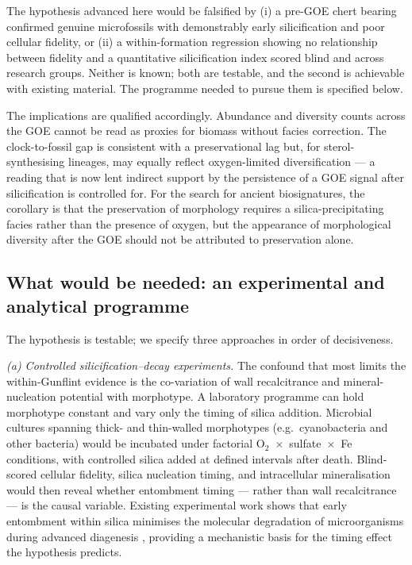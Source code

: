 \documentclass[11pt]{article}
\begin{document}
The hypothesis advanced here would be falsified by (i) a pre-GOE chert bearing confirmed genuine
microfossils with demonstrably early silicification and poor cellular fidelity, or (ii) a
within-formation regression showing no relationship between fidelity and a quantitative
silicification index scored blind and across research groups. Neither is known; both are testable,
and the second is achievable with existing material. The programme needed to pursue them is
specified below.

The implications are qualified accordingly. Abundance and diversity counts across the GOE cannot be
read as proxies for biomass without facies correction. The clock-to-fossil gap is consistent with a
preservational lag but, for sterol-synthesising lineages, may equally reflect oxygen-limited
diversification --- a reading that is now lent indirect support by the persistence of a GOE signal
after silicification is controlled for. For the search for ancient biosignatures, the corollary is
that the preservation of morphology requires a silica-precipitating facies rather than the presence
of oxygen, but the appearance of morphological diversity after the GOE should not be attributed to
preservation alone.

\subsection{What would be needed: an experimental and analytical programme}

The hypothesis is testable; we specify three approaches in order of decisiveness.

\textit{(a) Controlled silicification--decay experiments.} The confound that most limits the
within-Gunflint evidence is the co-variation of wall recalcitrance and mineral-nucleation potential
with morphotype. A laboratory programme can hold morphotype constant and vary only the timing of
silica addition. Microbial cultures spanning thick- and thin-walled morphotypes (e.g.\ cyanobacteria
and other bacteria) would be incubated under factorial O$_2$~$\times$~sulfate~$\times$~Fe conditions,
with controlled silica added at defined intervals after death. Blind-scored cellular fidelity, silica
nucleation timing, and intracellular mineralisation would then reveal whether entombment timing ---
rather than wall recalcitrance --- is the causal variable. Existing experimental work shows that
early entombment within silica minimises the molecular degradation of microorganisms during advanced
diagenesis \citep{Alleon2016silica}, providing a mechanistic basis for the timing effect the
hypothesis predicts.
\end{document}
